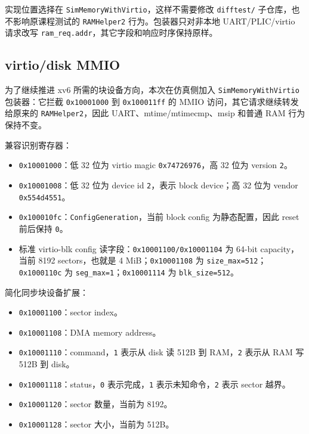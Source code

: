 \documentclass[UTF8,a4paper,11pt]{ctexart}
\begin{document}
实现位置选择在 \texttt{SimMemoryWithVirtio}，这样不需要修改 \texttt{difftest/} 子仓库，也不影响原课程测试的 \texttt{RAMHelper2} 行为。包装器只对非本地 UART/PLIC/virtio 请求改写 \texttt{ram\_req.addr}，其它字段和响应时序保持原样。

\subsection{virtio/disk MMIO}

为了继续推进 xv6 所需的块设备方向，本次在仿真侧加入 \texttt{SimMemoryWithVirtio} 包装器：它拦截 \texttt{0x10001000} 到 \texttt{0x100011ff} 的 MMIO 访问，其它请求继续转发给原来的 \texttt{RAMHelper2}，因此 UART、mtime/mtimecmp、msip 和普通 RAM 行为保持不变。

兼容识别寄存器：

\begin{itemize}
  \item \texttt{0x10001000}：低 32 位为 virtio magic \texttt{0x74726976}，高 32 位为 version \texttt{2}。
  \item \texttt{0x10001008}：低 32 位为 device id \texttt{2}，表示 block device；高 32 位为 vendor \texttt{0x554d4551}。
  \item \texttt{0x100010fc}：\texttt{ConfigGeneration}，当前 block config 为静态配置，因此 reset 前后保持 \texttt{0}。
  \item 标准 virtio-blk config 读字段：\texttt{0x10001100/0x10001104} 为 64-bit capacity，当前 8192 sectors，也就是 4 MiB；\texttt{0x10001108} 为 \texttt{size\_max=512}；\texttt{0x1000110c} 为 \texttt{seg\_max=1}；\texttt{0x10001114} 为 \texttt{blk\_size=512}。
\end{itemize}

简化同步块设备扩展：

\begin{itemize}
  \item \texttt{0x10001100}：sector index。
  \item \texttt{0x10001108}：DMA memory address。
  \item \texttt{0x10001110}：command，\texttt{1} 表示从 disk 读 512B 到 RAM，\texttt{2} 表示从 RAM 写 512B 到 disk。
  \item \texttt{0x10001118}：status，\texttt{0} 表示完成，\texttt{1} 表示未知命令，\texttt{2} 表示 sector 越界。
  \item \texttt{0x10001120}：sector 数量，当前为 8192。
  \item \texttt{0x10001128}：sector 大小，当前为 512B。
\end{itemize}
\end{document}

